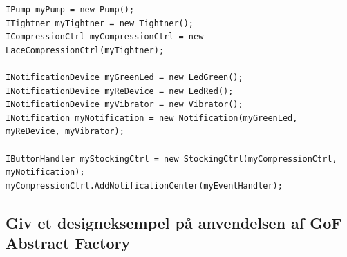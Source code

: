 \begin{lstlisting}[caption=Main for compressionstocking.application.,
label=code:compressionmain,
morekeywords={INotificationDevice,ICompressionCtrl,IButtonHandler}]
IPump myPump = new Pump();
ITightner myTightner = new Tightner();
ICompressionCtrl myCompressionCtrl = new LaceCompressionCtrl(myTightner);

INotificationDevice myGreenLed = new LedGreen();
INotificationDevice myReDevice = new LedRed();
INotificationDevice myVibrator = new Vibrator();
INotification myNotification = new Notification(myGreenLed, myReDevice, myVibrator);

IButtonHandler myStockingCtrl = new StockingCtrl(myCompressionCtrl, myNotification);
myCompressionCtrl.AddNotificationCenter(myEventHandler);
\end{lstlisting}



\subsection{Giv et designeksempel på anvendelsen af GoF Abstract Factory}
